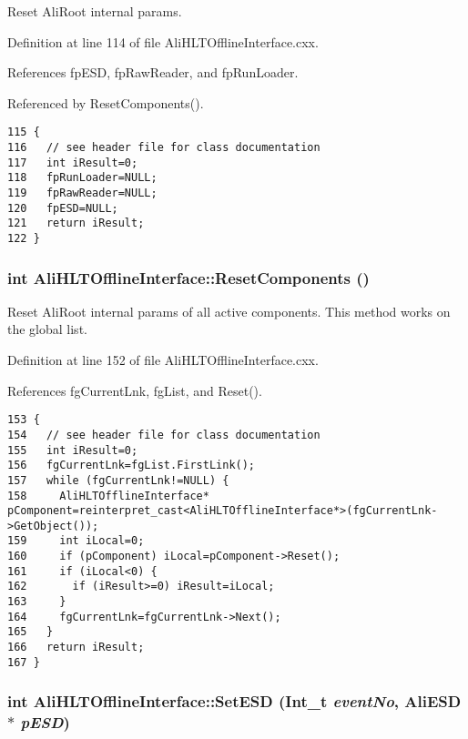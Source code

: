 Reset Ali\-Root internal params. 

Definition at line 114 of file Ali\-HLTOffline\-Interface.cxx.

References fp\-ESD, fp\-Raw\-Reader, and fp\-Run\-Loader.

Referenced by Reset\-Components().

\footnotesize\begin{verbatim}115 {
116   // see header file for class documentation
117   int iResult=0;
118   fpRunLoader=NULL;
119   fpRawReader=NULL;
120   fpESD=NULL;
121   return iResult;
122 }
\end{verbatim}\normalsize 


\subsubsection{\setlength{\rightskip}{0pt plus 5cm}int Ali\-HLTOffline\-Interface::Reset\-Components ()\hspace{0.3cm}{\tt  [static]}}\label{classAliHLTOfflineInterface_e2}


Reset Ali\-Root internal params of all active components. This method works on the global list. 

Definition at line 152 of file Ali\-HLTOffline\-Interface.cxx.

References fg\-Current\-Lnk, fg\-List, and Reset().

\footnotesize\begin{verbatim}153 {
154   // see header file for class documentation
155   int iResult=0;
156   fgCurrentLnk=fgList.FirstLink();
157   while (fgCurrentLnk!=NULL) {
158     AliHLTOfflineInterface* pComponent=reinterpret_cast<AliHLTOfflineInterface*>(fgCurrentLnk->GetObject());
159     int iLocal=0;
160     if (pComponent) iLocal=pComponent->Reset();
161     if (iLocal<0) {
162       if (iResult>=0) iResult=iLocal;
163     }
164     fgCurrentLnk=fgCurrentLnk->Next();
165   }
166   return iResult;
167 }
\end{verbatim}\normalsize 


\subsubsection{\setlength{\rightskip}{0pt plus 5cm}int Ali\-HLTOffline\-Interface::Set\-ESD (Int\_\-t {\em event\-No}, Ali\-ESD $\ast$ {\em p\-ESD})}\label{classAliHLTOfflineInterface_a7}


